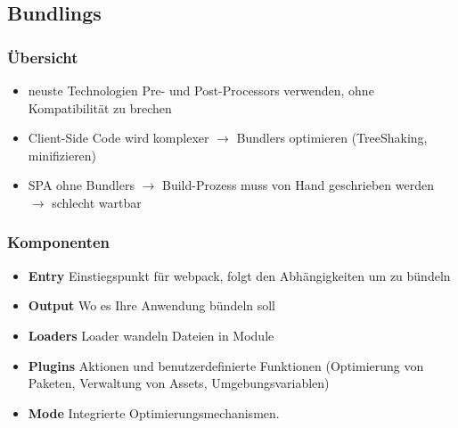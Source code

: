 
\subsection{Bundlings}

\subsubsection{Übersicht}
\begin{itemize}
    \item neuste Technologien Pre- und Post-Processors verwenden, ohne Kompatibilität zu brechen
    \item Client-Side Code wird komplexer $\rightarrow$ Bundlers optimieren (TreeShaking, minifizieren)
    \item SPA ohne Bundlers $\rightarrow$ Build-Prozess muss von Hand geschrieben werden $\rightarrow$ schlecht wartbar
\end{itemize}

\subsubsection{Komponenten}
\begin{itemize}
    \item \textbf{Entry}
    Einstiegspunkt für webpack, folgt den Abhängigkeiten um zu bündeln
    \item \textbf{Output}
    Wo es Ihre Anwendung bündeln soll
    \item \textbf{Loaders}
    Loader wandeln Dateien in Module
    \item \textbf{Plugins}
    Aktionen und benutzerdefinierte Funktionen (Optimierung von Paketen, Verwaltung von Assets, Umgebungsvariablen)
    \item \textbf{Mode}
    Integrierte Optimierungsmechanismen.
\end{itemize}